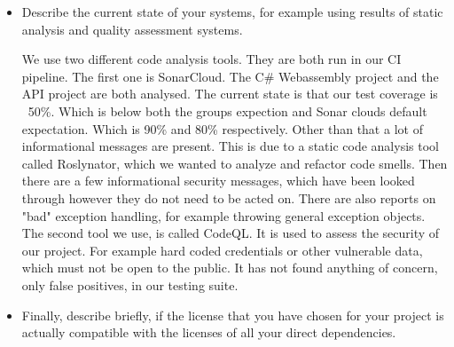 \begin{itemize}
                                              


  
  .......................
  

  \item Describe the current state of your systems, for example using results of static analysis and quality assessment systems.

        We use two different code analysis tools. 
        They are both run in our CI pipeline. 
        The first one is SonarCloud. The C\# Webassembly project and the API project are both analysed. 
        The current state is that our test coverage is ~50\%. Which is below both the groups expection and Sonar clouds default expectation. 
        Which is 90\% and 80\% respectively. 
        Other than that a lot of informational messages are present. 
        This is due to a static code analysis tool called Roslynator, which we wanted to analyze and refactor code smells. 
        Then there are a few informational security messages, which have been looked through however they do not need to be acted on. 
        There are also reports on "bad" exception handling, for example throwing general exception objects.
        The second tool we use, is called CodeQL. It is used to assess the security of our project.
        For example hard coded credentials or other vulnerable data, which must not be open to the public.
        It has not found anything of concern, only false positives, in our testing suite.
  \item Finally, describe briefly, if the license that you have chosen for your project is actually compatible with the licenses of all your direct dependencies.
  
\end{itemize}